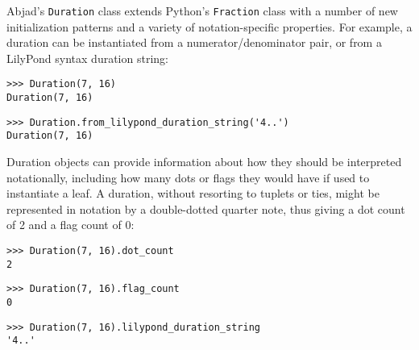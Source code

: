 Abjad's \texttt{Duration} class extends Python's \texttt{Fraction} class with a
number of new initialization patterns and a variety of notation-specific
properties. For example, a  duration can be instantiated from a
numerator/denominator pair, or from a LilyPond syntax duration string:

\begin{comment}
<abjad>
Duration(7, 16)
Duration.from_lilypond_duration_string('4..')
</abjad>
\end{comment}

\begin{abjadbookoutput}
\begin{singlespacing}
\vspace{-0.5\baselineskip}
\begin{lstlisting}
>>> Duration(7, 16)
Duration(7, 16)
\end{lstlisting}
\begin{lstlisting}
>>> Duration.from_lilypond_duration_string('4..')
Duration(7, 16)
\end{lstlisting}
\end{singlespacing}
\end{abjadbookoutput}

\noindent Duration objects can provide information about how they should be
interpreted notationally, including how many dots or flags they would have if
used to instantiate a leaf. A  duration, without resorting to
tuplets or ties, might be represented in notation by a double-dotted quarter
note, thus giving a dot count of 2 and a flag count of 0:

\begin{comment}
<abjad>
Duration(7, 16).dot_count
Duration(7, 16).flag_count
Duration(7, 16).lilypond_duration_string
</abjad>
\end{comment}

\begin{abjadbookoutput}
\begin{singlespacing}
\vspace{-0.5\baselineskip}
\begin{lstlisting}
>>> Duration(7, 16).dot_count
2
\end{lstlisting}
\begin{lstlisting}
>>> Duration(7, 16).flag_count
0
\end{lstlisting}
\begin{lstlisting}
>>> Duration(7, 16).lilypond_duration_string
'4..'
\end{lstlisting}
\end{singlespacing}
\end{abjadbookoutput}

